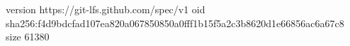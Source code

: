 version https://git-lfs.github.com/spec/v1
oid sha256:f4d9bdcfad107ea820a067850850a0fff1b15f5a2c3b8620d1e66856ac6a67c8
size 61380
